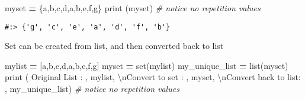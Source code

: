 \documentclass[
]{book}
\newenvironment{Shaded}{\begin{snugshade}}{\end{snugshade}}
\newcommand{\BuiltInTok}[1]{#1}
\newcommand{\CharTok}[1]{\textcolor[rgb]{0.5,0.5,0.5}{#1}}
\newcommand{\CommentTok}[1]{\textcolor[rgb]{0.37,0.37,0.37}{\textit{#1}}}
\newcommand{\NormalTok}[1]{#1}
\newcommand{\OperatorTok}[1]{\textcolor[rgb]{0.43,0.43,0.43}{\textbf{#1}}}
\newcommand{\StringTok}[1]{\textcolor[rgb]{0.5,0.5,0.5}{#1}}
\begin{document}
\begin{Shaded}
\begin{Highlighting}[]
\NormalTok{myset }\OperatorTok{=}\NormalTok{ \{}\StringTok{\textquotesingle{}a\textquotesingle{}}\NormalTok{,}\StringTok{\textquotesingle{}b\textquotesingle{}}\NormalTok{,}\StringTok{\textquotesingle{}c\textquotesingle{}}\NormalTok{,}\StringTok{\textquotesingle{}d\textquotesingle{}}\NormalTok{,}\StringTok{\textquotesingle{}a\textquotesingle{}}\NormalTok{,}\StringTok{\textquotesingle{}b\textquotesingle{}}\NormalTok{,}\StringTok{\textquotesingle{}e\textquotesingle{}}\NormalTok{,}\StringTok{\textquotesingle{}f\textquotesingle{}}\NormalTok{,}\StringTok{\textquotesingle{}g\textquotesingle{}}\NormalTok{\}}
\BuiltInTok{print}\NormalTok{ (myset) }\CommentTok{\# notice no repetition values}
\end{Highlighting}
\end{Shaded}

\begin{verbatim}
#:> {'g', 'c', 'e', 'a', 'd', 'f', 'b'}
\end{verbatim}

Set can be created from list, and then converted back to list

\begin{Shaded}
\begin{Highlighting}[]
\NormalTok{mylist }\OperatorTok{=}\NormalTok{ [}\StringTok{\textquotesingle{}a\textquotesingle{}}\NormalTok{,}\StringTok{\textquotesingle{}b\textquotesingle{}}\NormalTok{,}\StringTok{\textquotesingle{}c\textquotesingle{}}\NormalTok{,}\StringTok{\textquotesingle{}d\textquotesingle{}}\NormalTok{,}\StringTok{\textquotesingle{}a\textquotesingle{}}\NormalTok{,}\StringTok{\textquotesingle{}b\textquotesingle{}}\NormalTok{,}\StringTok{\textquotesingle{}e\textquotesingle{}}\NormalTok{,}\StringTok{\textquotesingle{}f\textquotesingle{}}\NormalTok{,}\StringTok{\textquotesingle{}g\textquotesingle{}}\NormalTok{]}
\NormalTok{myset }\OperatorTok{=} \BuiltInTok{set}\NormalTok{(mylist)}
\NormalTok{my\_unique\_list }\OperatorTok{=} \BuiltInTok{list}\NormalTok{(myset)}
\BuiltInTok{print}\NormalTok{ (}
  \StringTok{\textquotesingle{}Original List       : \textquotesingle{}}\NormalTok{, mylist,}
  \StringTok{\textquotesingle{}}\CharTok{\textbackslash{}n}\StringTok{Convert to set      : \textquotesingle{}}\NormalTok{, myset,}
  \StringTok{\textquotesingle{}}\CharTok{\textbackslash{}n}\StringTok{Convert back to list: \textquotesingle{}}\NormalTok{, my\_unique\_list) }\CommentTok{\# notice no repetition values}
\end{Highlighting}
\end{Shaded}
\end{document}
